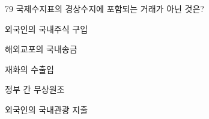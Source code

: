 \begin{question}{79}
국제수지표의 경상수지에 포함되는 거래가 아닌 것은?
\begin{choices}
  \item 외국인의 국내주식 구입
  \item 해외교포의 국내송금
  \item 재화의 수출입
  \item 정부 간 무상원조
  \item 외국인의 국내관광 지출
\end{choices}
\end{question}

